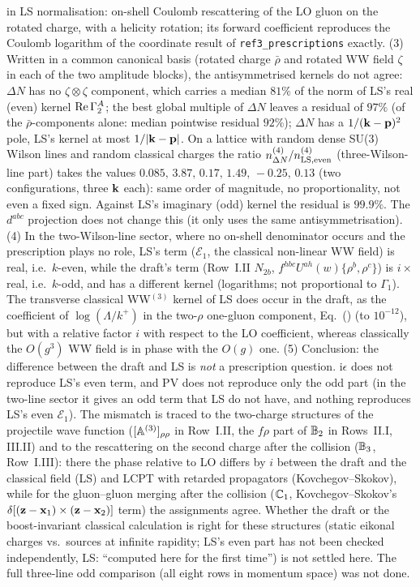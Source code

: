in LS normalisation: on-shell Coulomb rescattering of the LO gluon on the rotated charge, with a helicity rotation; its forward coefficient reproduces the Coulomb logarithm of the coordinate result of \texttt{ref3\_prescriptions} exactly. (3) Written in a common canonical basis (rotated charge $\bar\rho$ and rotated WW field $\zeta$ in each of the two amplitude blocks), the antisymmetrised kernels do not agree: $\Delta N$ has no $\zeta\otimes\zeta$ component, which carries a median $81\%$ of the norm of LS's real (even) kernel ${\rm Re}\,\Gamma_2^A$; the best global multiple of $\Delta N$ leaves a residual of $97\%$ (of the $\bar\rho$-components alone: median pointwise residual $92\%$); $\Delta N$ has a $1/(\mathbf{k}-\mathbf{p})^2$ pole, LS's kernel at most $1/|\mathbf{k}-\mathbf{p}|$. On a lattice with random dense SU(3) Wilson lines and random classical charges the ratio $n^{(4)}_{\Delta N}/n^{(4)}_{\rm LS,even}$ (three-Wilson-line part) takes the values $0.085,\,3.87,\,0.17,\,1.49,\,-0.25,\,0.13$ (two configurations, three $\mathbf{k}$ each): same order of magnitude, no proportionality, not even a fixed sign. Against LS's imaginary (odd) kernel the residual is $99.9\%$. The $d^{abc}$ projection does not change this (it only uses the same antisymmetrisation). (4) In the two-Wilson-line sector, where no on-shell denominator occurs and the prescription plays no role, LS's term ($\mathcal E_1$, the classical non-linear WW field) is real, i.e.\ $k$-even, while the draft's term (Row~I.II $N_{2b}$, $f^{hbc}U^{ah}(w)\{\rho^b,\rho^c\}$) is $i\times$real, i.e.\ $k$-odd, and has a different kernel (logarithms; not proportional to $\Gamma_1$). The transverse classical WW$^{(3)}$ kernel of LS does occur in the draft, as the coefficient of $\log(\Lambda/k^+)$ in the two-$\rho$ one-gluon component, Eq.~() (to $10^{-12}$), but with a relative factor $i$ with respect to the LO coefficient, whereas classically the $O(g^3)$ WW field is in phase with the $O(g)$ one. (5) Conclusion: the difference between the draft and LS is \emph{not} a prescription question. i$\epsilon$ does not reproduce LS's even term, and PV does not reproduce only the odd part (in the two-line sector it gives an odd term that LS do not have, and nothing reproduces LS's even $\mathcal E_1$). The mismatch is traced to the two-charge structures of the projectile wave function ($[\mathbb{A}^{(3)}]_{\rho\rho}$ in Row~I.II, the $f\rho$ part of $\mathbb{B}_2$ in Rows~II.I, III.II) and to the rescattering on the second charge after the collision ($\mathbb{B}_3$, Row~I.III): there the phase relative to LO differs by $i$ between the draft and the classical field (LS) and LCPT with retarded propagators (Kovchegov--Skokov), while for the gluon--gluon merging after the collision ($\mathbb{C}_1$, Kovchegov--Skokov's $\delta[(\mathbf{z}-\mathbf{x}_1)\times(\mathbf{z}-\mathbf{x}_2)]$ term) the assignments agree. Whether the draft or the boost-invariant classical calculation is right for these structures (static eikonal charges vs.\ sources at infinite rapidity; LS's even part has not been checked independently, LS: ``computed here for the first time'') is not settled here. The full three-line odd comparison (all eight rows in momentum space) was not done.

